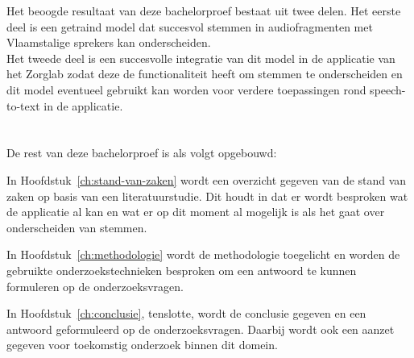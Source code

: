 Het beoogde resultaat van deze bachelorproef bestaat uit twee delen. Het eerste deel is een getraind model dat succesvol stemmen in audiofragmenten met Vlaamstalige sprekers kan onderscheiden.\\
Het tweede deel is een succesvolle integratie van dit model in de applicatie van het Zorglab zodat deze de functionaliteit heeft om stemmen te onderscheiden en dit model eventueel gebruikt kan worden voor verdere toepassingen rond speech-to-text in de applicatie.

\section{}%
\label{sec:opzet-bachelorproef}


De rest van deze bachelorproef is als volgt opgebouwd:

In Hoofdstuk~\ref{ch:stand-van-zaken} wordt een overzicht gegeven van de stand van zaken op basis van een literatuurstudie. Dit houdt in dat er wordt besproken wat de applicatie al kan en wat er op dit moment al mogelijk is als het gaat over onderscheiden van stemmen.

In Hoofdstuk~\ref{ch:methodologie} wordt de methodologie toegelicht en worden de gebruikte onderzoekstechnieken besproken om een antwoord te kunnen formuleren op de onderzoeksvragen.


In Hoofdstuk~\ref{ch:conclusie}, tenslotte, wordt de conclusie gegeven en een antwoord geformuleerd op de onderzoeksvragen. Daarbij wordt ook een aanzet gegeven voor toekomstig onderzoek binnen dit domein.
